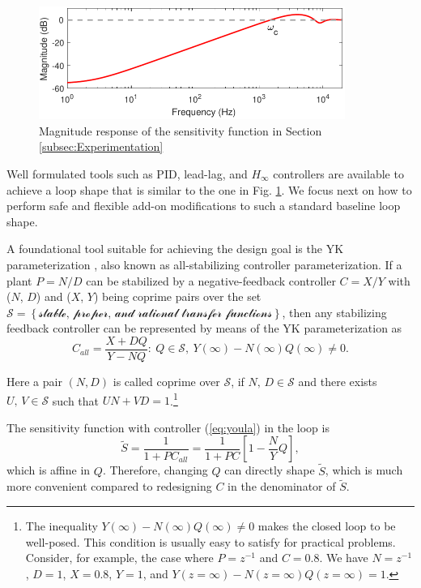 \documentclass [11pt, proquest] {uwthesis}[2020/02/24]
\begin{document}
\begin{figure}[!ht]
\begin{centering}
\includegraphics[width=10cm]{Loop-shaping/baseline_SISO_S_mag_3}
\par\end{centering}
\caption{\label{fig:A-typical-magnitude}Magnitude response of the sensitivity
function in Section \ref{subsec:Experimentation}}
\end{figure}

Well formulated tools such as PID, lead-lag, and $H_{\infty}$ controllers
are available to achieve a loop shape that is similar to the one in
Fig. \ref{fig:A-typical-magnitude}. We focus next on how to perform
safe and flexible add-on modifications to such a standard baseline
loop shape.

A foundational tool suitable for achieving the design goal is the
YK parameterization \cite{youla1976modern,kucera1975stability}, also
known as all-stabilizing controller parameterization. If a plant $P=N/D$
can be stabilized by a negative-feedback controller $C=X/Y$ with
($N$, $D$) and ($X$, $Y$) being coprime pairs over the set $\mathcal{S=\left\{ \text{stable, proper, and rational transfer functions}\right\} }$,
then any stabilizing feedback controller can be represented by means
of the YK parameterization as
\begin{equation}
C_{all}=\frac{X+DQ}{Y-NQ}:\ Q\in\mathcal{S},\ Y(\infty)-N(\infty)Q(\infty)\neq0.\label{eq:youla}
\end{equation}

Here a pair $\left(N,D\right)$ is called coprime over $\mathcal{S}$,
if $N,\,D\in\mathcal{S}$ and there exists $U,\,V\in\mathcal{S}$
such that $UN+VD=1$.\footnote{The inequality $Y(\infty)-N(\infty)Q(\infty)\neq0$ makes the closed
loop to be well-posed. This condition is usually easy to satisfy for
practical problems. Consider, for example, the case where $P=z^{-1}$
and $C=0.8$. We have $N=z^{-1}$, $D=1$, $X=0.8$, $Y=1$, and $Y(z=\infty)-N(z=\infty)Q(z=\infty)=1$.} 

The sensitivity function with controller (\ref{eq:youla}) in the
loop is
\begin{equation}
\tilde{S}=\frac{1}{1+PC_{all}}=\frac{1}{1+PC}\left[1-\frac{N}{Y}Q\right],\label{eq:generalYoula_S}
\end{equation}
which is affine in $Q$. Therefore, changing $Q$ can directly shape
$\tilde{S}$, which is much more convenient compared to redesigning
$C$ in the denominator of $\tilde{S}$.
\end{document}
